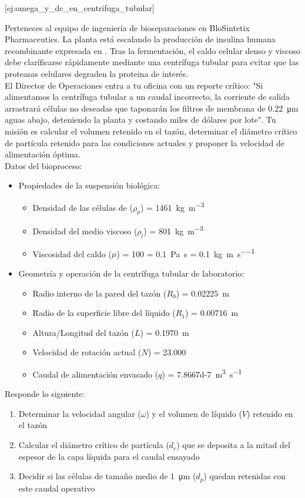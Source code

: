 \documentclass{AsignaturaResumen}
\begin{document}
[ej:omega_y_dc_en_centrifuga_tubular]{
    Perteneces al equipo de ingeniería de bioseparaciones en BloSintetix Pharmaceutics. La planta está escalando la producción de insulina humana recombinante expresada en . Tras la fermentación, el caldo celular denso y viscoso debe claríficarse rápidamente mediante una centrífuga tubular para evitar que las proteasas celulares degraden la proteina de interés. \\
    El Director de Operaciones entra a tu oficina con un reporte crítico: "Si alimentamos la centrífuga tubular a un caudal incorrecto, la corriente de salida arrastrará células no deseadas que taponarán los filtros de membrana de \qty{0.22}{\micro\m} aguas abajo, deteniendo la planta y costando miles de dólares por lote". Tu misión es calcular el volumen retenido en el tazón, determinar el diámetro crítico de partícula retenido para las condiciones actuales y proponer la velocidad de alimentación óptima. \\
    Datos del bioproceso:
    \begin{itemize}
        \item Propiedades de la suspensión biológica:
	    \begin{itemize}
	        \item Densidad de las células de  ($\rho_{p}$) = \qty{1461}{\kg\per\m\cubed}
	        \item Densidad del medio viscoso ($\rho_{l}$) = \qty{801}{\kg\per\m\cubed}
	        \item Viscosidad del caldo ($\mu$) = \qty{100}{\cp} = \qty{0.1}{\pascal\s} = \qty{0.1}{\kg\per\m\per\s}
	    \end{itemize}
    \item Geometría y operación de la centrífuga tubular de laboratorio:
	    \begin{itemize}
	        \item Radio interno de la pared del tazón ($R_{0}$) = \qty{0.02225}{\m}
	        \item Radio de la superficie libre del líquido ($R_{1}$) = \qty{0.00716}{\m}
	        \item Altura/Longitud del tazón ($L$) = \qty{0.1970}{\m}
	        \item Velocidad de rotación actual ($N$) = \qty{23,000}{\rpm}
	        \item Caudal de alimentación envasado ($q$) = \qty{7.8667d-7}{\m\cubed\per\s}
	    \end{itemize}
    \end{itemize}
    Responde lo siguiente:
    \begin{enumerate}
        \item Determinar la velocidad angular ($\omega$) y el volumen de líquido ($V$) retenido en el tazón
        \item Calcular el diámetro crítico de partícula ($d_{c}$) que se deposita a la mitad del espesor de la capa líquida para el caudal ensayado
        \item Decidir si las células de tamaño medio de \qty{1}{\micro\m} ($d_{p}$) quedan retenidas con este caudal operativo
    \end{enumerate}
}
\end{document}
